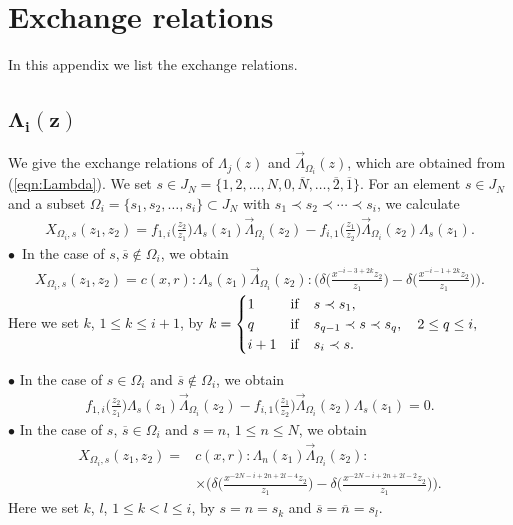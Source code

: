 \documentclass[10pt,a4paper]{amsart}
\numberwithin{equation}{section}
\begin{document}
\section{Exchange relations}\label{appendix:exchange}
In this appendix we list the exchange relations.

\subsection[\protect{$Lambda\_\{i\}(z)$}]
{$\boldsymbol{\Lambda_i(z)}$}
We give the exchange relations of $\Lambda_j(z)$ and $\overrightarrow{\Lambda}_{\Omega_i}(z)$,
which are obtained from (\ref{eqn:Lambda}).
We set $s \in J_N=\{1, 2, \dots, N, 0, \overline{N}, \dots, \overline{2}, \overline{1}\}$.
For an element $s \in J_N$ and a subset
$\Omega_i=\{s_1, s_2, \dots, s_i\} \subset J_N$ with $s_1 \prec s_2 \prec \cdots \prec s_i$, we calculate
\begin{gather*}
X_{\Omega_i,s}(z_1,z_2)=f_{1,i}\bigg(\frac{z_2}{z_1}\bigg)\Lambda_s(z_1) \overrightarrow{\Lambda}_{\Omega_i}(z_2)-
f_{i,1}\bigg(\frac{z_1}{z_2}\bigg)\overrightarrow{\Lambda}_{\Omega_i}(z_2)\Lambda_s(z_1).
\end{gather*}
$\bullet$~In the case of $s, \overline{s} \notin \Omega_i$, we obtain
\begin{gather}
{X_{\Omega_i,s}(z_1,z_2)}=
c(x,r){:}\Lambda_s(z_1)\overrightarrow{\Lambda}_{\Omega_i}(z_2){:}
\bigg(\delta\bigg(\frac{x^{-i-3+2k} z_2}{z_1}\bigg)-
\delta\bigg(\frac{x^{-i-1+2k} z_2}{z_1}\bigg)\bigg).
\label{exchange:L1}
\end{gather}
Here we set $k$, $1\leq k \leq i+1$, by
$k=\begin{cases}
1&{\rm if}\quad s\prec s_1,\\
q&{\rm if}\quad s_{q-1}\prec s \prec s_q,\quad 2 \leq q \leq i,\\
i+1&{\rm if}\quad s_i \prec s.
\end{cases}$

\noindent
$\bullet$
In the case of $s \in \Omega_i$ and $\overline{s} \notin \Omega_i$,
we obtain
\begin{gather}
f_{1,i}\bigg(\frac{z_2}{z_1}\bigg)\Lambda_s(z_1)\overrightarrow{\Lambda}_{\Omega_i}(z_2)-
f_{i,1}\bigg(\frac{z_1}{z_2}\bigg)\overrightarrow{\Lambda}_{\Omega_i}(z_2)\Lambda_s(z_1)=0.
\label{exchange:L2}
\end{gather}
$\bullet$
In the case of $s$, $\overline{s} \in \Omega_i$ and $s=n$,
$1\leq n \leq N$, we obtain
\begin{align}
X_{\Omega_i,s}(z_1,z_2)={}&
c(x,r){:}\Lambda_n(z_1)\overrightarrow{\Lambda}_{\Omega_i}(z_2){:}\nonumber
\\
&\times\bigg(\delta\bigg(\frac{x^{-2N-i+2n+2l-4}z_2}{z_1}\bigg)-
\delta\bigg(\frac{x^{-2N-i+2n+2l-2} z_2}{z_1}\bigg)\bigg).
\label{exchange:L3}
\end{align}
Here we set $k$, $l$, $1\leq k<l \leq i$, by $s=n=s_k$ and
$\overline{s}=\overline{n}=s_l$.
\end{document}

